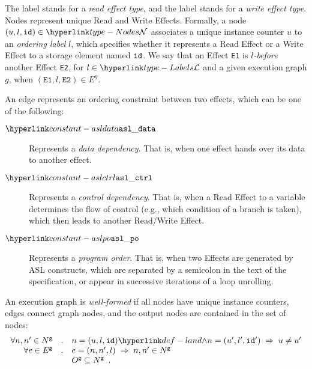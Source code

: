 
The label
stands for a \emph{read effect type}, and the label
stands for a \emph{write effect type}.
%
Nodes represent unique Read and Write Effects. Formally, a node $(u,l,\id) \in \Nodes$ associates a unique instance counter $u$
to an \emph{ordering label} $l$, which specifies whether it represents a Read Effect or a Write Effect to a storage element named $\texttt{id}$.
%
We say that an Effect \texttt{E1} is \emph{$l$-before} another Effect \texttt{E2}, for $l\in \Labels$ and a given execution graph
$g$, when $(\texttt{E1}, l, \texttt{E2}) \in E^g$.

An edge represents an ordering constraint between two effects, which can be one of the following:
\hypertarget{constant-asldata}{}
\begin{description}
\item[$\asldata$] Represents a \emph{data dependency}.
That is, when one effect hands over its data to another effect.
\hypertarget{constant-aslctrl}{}
\item[$\aslctrl$] Represents a \emph{control dependency}.
That is, when a Read Effect to a variable determines the flow of control (e.g., which condition of a branch is taken),
which then leads to another Read/Write Effect.
\hypertarget{constant-aslpo}{}
\item[$\aslpo$] Represents a \emph{program order}.
That is, when two Effects are generated by ASL constructs, which are separated by a semicolon in the text of the specification,
or appear in successive iterations of a loop unrolling.
\end{description}

An execution graph is \emph{well-formed} if all nodes have unique instance counters, edges connect graph nodes,
and the output nodes are contained in the set of nodes:
\[
  \begin{array}{rcl}
  \forall n, n' \in N^\xgraph &.& n=(u,l,\id) \land n=(u',l',\id') \;\Rightarrow\; u \neq u' \\
  \forall e \in E^\xgraph &.& e=(n, n', l) \;\Rightarrow\; n, n' \in N^\xgraph \\
  & & O^\xgraph \subseteq N^\xgraph \enspace.
  \end{array}
\]
\hypertarget{constant-emptygraph}{}

